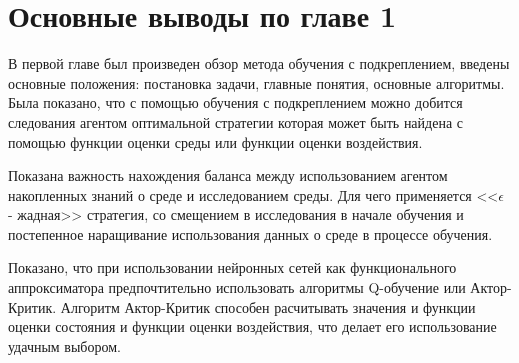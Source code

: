 \section{Основные выводы по главе 1} \label{sect1_7}

В первой главе был произведен обзор метода обучения с подкреплением, введены основные положения: постановка задачи, главные понятия, основные алгоритмы. Была показано, что с помощью обучения с подкреплением можно добится следования агентом оптимальной стратегии которая может быть найдена с помощью функции оценки среды или функции оценки воздействия. 

Показана важность нахождения баланса между использованием агентом накопленных знаний о среде и исследованием среды. Для чего применяется <<$\epsilon$ - жадная>> стратегия, со смещением в исследования в начале обучения и постепенное наращивание использования данных о среде в процессе обучения.

Показано, что при использовании нейронных сетей как функционального аппроксиматора предпочтительно использовать алгоритмы Q-обучение или Актор-Критик. Алгоритм Актор-Критик способен расчитывать значения и функции оценки состояния и функции оценки воздействия, что делает его использование удачным выбором.